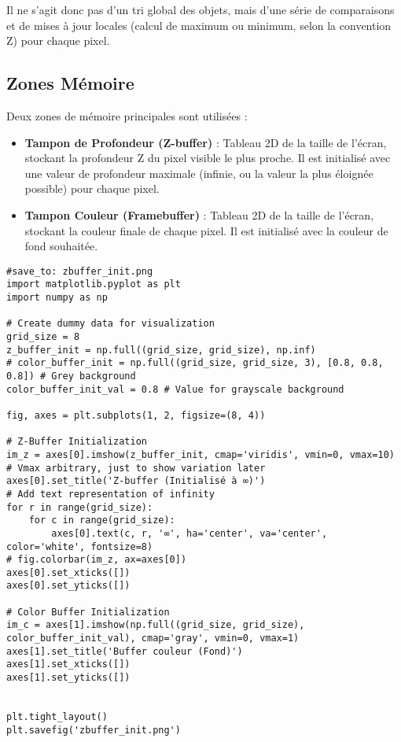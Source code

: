 \documentclass{article}
\begin{document}
Il ne s'agit donc pas d'un tri global des objets, mais d'une série de comparaisons et de mises à jour locales (calcul de maximum ou minimum, selon la convention Z) pour chaque pixel.

\subsection{Zones Mémoire}

Deux zones de mémoire principales sont utilisées :
\begin{itemize}
    \item \textbf{Tampon de Profondeur (Z-buffer)} : Tableau 2D de la taille de l'écran, stockant la profondeur Z du pixel visible le plus proche. Il est initialisé avec une valeur de profondeur maximale (infinie, ou la valeur la plus éloignée possible) pour chaque pixel.
    \item \textbf{Tampon Couleur (Framebuffer)} : Tableau 2D de la taille de l'écran, stockant la couleur finale de chaque pixel. Il est initialisé avec la couleur de fond souhaitée.
\end{itemize}

\begin{verbatim}
#save_to: zbuffer_init.png
import matplotlib.pyplot as plt
import numpy as np

# Create dummy data for visualization
grid_size = 8
z_buffer_init = np.full((grid_size, grid_size), np.inf)
# color_buffer_init = np.full((grid_size, grid_size, 3), [0.8, 0.8, 0.8]) # Grey background
color_buffer_init_val = 0.8 # Value for grayscale background

fig, axes = plt.subplots(1, 2, figsize=(8, 4))

# Z-Buffer Initialization
im_z = axes[0].imshow(z_buffer_init, cmap='viridis', vmin=0, vmax=10) # Vmax arbitrary, just to show variation later
axes[0].set_title('Z-buffer (Initialisé à ∞)')
# Add text representation of infinity
for r in range(grid_size):
    for c in range(grid_size):
        axes[0].text(c, r, '∞', ha='center', va='center', color='white', fontsize=8)
# fig.colorbar(im_z, ax=axes[0])
axes[0].set_xticks([])
axes[0].set_yticks([])

# Color Buffer Initialization
im_c = axes[1].imshow(np.full((grid_size, grid_size), color_buffer_init_val), cmap='gray', vmin=0, vmax=1)
axes[1].set_title('Buffer couleur (Fond)')
axes[1].set_xticks([])
axes[1].set_yticks([])


plt.tight_layout()
plt.savefig('zbuffer_init.png')
\end{verbatim}
\end{document}
